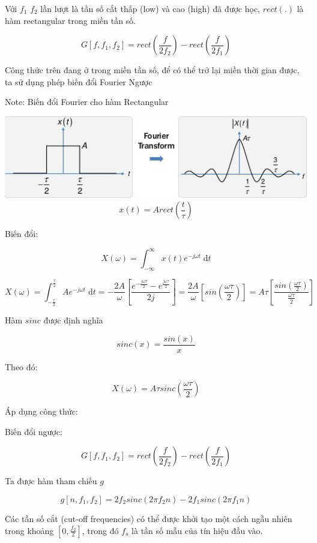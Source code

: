 \documentclass{article}
\begin{document}
	Với $f_1$ $f_2$ lần lượt là tần số cắt thấp (low) và cao (high) đã được học, $rect(.)$ là hàm rectangular trong miền tần số.
	
	$$G[f, f_1, f_2] = rect\left(\frac{f}{2f_2}\right) -  rect\left(\frac{f}{2f_1}\right)$$
	
	Công thức trên đang ở trong miền tần số, để có thể trở lại miền thời gian được, ta sử dụng phép biến đổi Fourier Ngược
	
	Note: Biến đổi Fourier cho hàm Rectangular
	
	\includegraphics[width=1\textwidth]{images/rect_fourier.jpg}\\
	
	$$x(t) = Arect(\frac{t}{\tau})$$
	
	Biến đổi:
	
	$$X(\omega) = \int_{-\infty}^{\infty} x(t)e^{-j \omega t}\;\mathrm{d}t 
	$$
	
	$$X(\omega) = \int_{-\frac{\tau}{2}}^{\frac{\tau}{2}} Ae^{-j \omega t}\;\mathrm{d}t 
	= -\frac{2A}{\omega}\left[\frac{e^{-\frac{j \omega \tau}{2}} - e^{\frac{j \omega \tau}{2}}}{2j}\right]
	= \frac{2A}{\omega} \left[sin\left(\frac{\omega \tau}{2}\right)\right]
	= A\tau \left[\frac{sin(\frac{\omega \tau}{2})}{\frac{\omega \tau}{2}}\right]
	$$
	
	Hàm $sinc$ được định nghĩa
	
	$$sinc(x) = \frac{sin(x)}{x}$$
	
	Theo đó:
	
	$$X(\omega) = A\tau sinc\left(\frac{\omega \tau}{2}\right)$$
	
	Áp dụng công thức:
	
	Biến đổi ngược:
	
	$$G[f, f_1, f_2] = rect\left(\frac{f}{2f_2}\right) -  rect\left(\frac{f}{2f_1}\right)$$
	
	Ta được hàm tham chiếu $g$
	
	$$g[n, f_1, f_2] = 2f_2sinc(2\pi f_2 n) - 2f_1sinc(2\pi f_1 n)$$ 
	
	Các tần số cắt (cut-off frequencies) có thể được khởi tạo một cách ngẫu nhiên trong khoảng $\left[0, \frac{f_2}{2}\right]$, trong đó $f_s$ là tần số mẫu của tín hiệu đầu vào.
	
\end{document}
